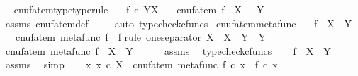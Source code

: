 \begin{isabellebody}
\endisatagproof
{\isafoldproof}%
%
\isadelimproof
\ \isanewline
%
\endisadelimproof
\isanewline
{}\isamarkupfalse%
\ cnufatem{\isacharunderscore}{\kern0pt}type{\isacharbrackleft}{\kern0pt}type{\isacharunderscore}{\kern0pt}rule{\isacharbrackright}{\kern0pt}{\isacharcolon}{\kern0pt}\isanewline
\ \ \ {\isachardoublequoteopen}f\ {\isasymin}\isactrlsub c\ Y\isactrlbsup X\isactrlesup {\isachardoublequoteclose}\isanewline
\ \ \ {\isachardoublequoteopen}cnufatem\ f\ {\isacharcolon}{\kern0pt}\ X\ \ {\isasymrightarrow}\ Y{\isachardoublequoteclose}\isanewline
%
\isadelimproof
\ \ %
\endisadelimproof
%
\isatagproof
{}\isamarkupfalse%
\ assms\ cnufatem{\isacharunderscore}{\kern0pt}def{}\ \isanewline
\ \ \isamarkupfalse%
\ {\isacharparenleft}{\kern0pt}auto{\isacharcomma}{\kern0pt}\ typecheck{\isacharunderscore}{\kern0pt}cfuncs{\isacharparenright}{\kern0pt}%
\endisatagproof
{\isafoldproof}%
%
\isadelimproof
\isanewline
%
\endisadelimproof
\isanewline
{}\isamarkupfalse%
\ cnufatem{\isacharunderscore}{\kern0pt}metafunc{\isacharcolon}{\kern0pt}\isanewline
\ \ \ {\isachardoublequoteopen}f\ {\isacharcolon}{\kern0pt}\ X\ {\isasymrightarrow}\ Y{\isachardoublequoteclose}\isanewline
\ \ \ {\isachardoublequoteopen}cnufatem\ {\isacharparenleft}{\kern0pt}metafunc\ f{\isacharparenright}{\kern0pt}\ {\isacharequal}{\kern0pt}\ f{\isachardoublequoteclose}\isanewline
%
\isadelimproof
%
\endisadelimproof
%
\isatagproof
{}\isamarkupfalse%
{\isacharparenleft}{\kern0pt}rule\ one{\isacharunderscore}{\kern0pt}separator{\isacharbrackleft}{\kern0pt}\ X\ {\isacharequal}{\kern0pt}\ X{\isacharcomma}{\kern0pt}\ \ Y\ {\isacharequal}{\kern0pt}\ Y{\isacharbrackright}{\kern0pt}{\isacharparenright}{\kern0pt}\isanewline
\ \ \isamarkupfalse%
\ {\isachardoublequoteopen}cnufatem\ {\isacharparenleft}{\kern0pt}metafunc\ f{\isacharparenright}{\kern0pt}\ {\isacharcolon}{\kern0pt}\ X\ {\isasymrightarrow}\ Y{\isachardoublequoteclose}\isanewline
\ \ \ \ \isamarkupfalse%
\ assms\ \isamarkupfalse%
\ typecheck{\isacharunderscore}{\kern0pt}cfuncs\isanewline
\ \ \isamarkupfalse%
\ {\isachardoublequoteopen}f\ {\isacharcolon}{\kern0pt}\ X\ {\isasymrightarrow}\ Y{\isachardoublequoteclose}\isanewline
\ \ \ \ \isamarkupfalse%
\ assms\ \isamarkupfalse%
\ simp\isanewline
\ \ \isamarkupfalse%
\ {\isachardoublequoteopen}{\isasymAnd}x{\isachardot}{\kern0pt}\ x\ {\isasymin}\isactrlsub c\ X\ {\isasymLongrightarrow}\ cnufatem\ {\isacharparenleft}{\kern0pt}metafunc\ f{\isacharparenright}{\kern0pt}\ {\isasymcirc}\isactrlsub c\ x\ {\isacharequal}{\kern0pt}\ f\ {\isasymcirc}\isactrlsub c\ x{\isachardoublequoteclose}\isanewline

\end{isabellebody}
